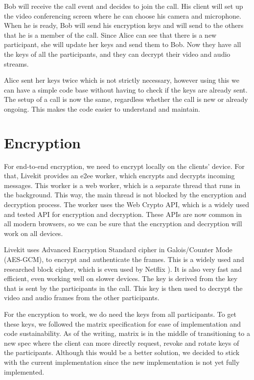 \documentclass{report}
\begin{document}
Bob will receive the call event and decides to join the call. His client will set up the video conferencing
screen where he can choose his camera and microphone. When he is ready, Bob will send his encryption keys and will
send to the others that he is a member of the call. Since Alice can see that there is a new participant, she will
update her keys and send them to Bob. Now they have all the keys of all the participants, and they can decrypt their
video and audio streams.

Alice sent her keys twice which is not strictly necessary, however using this we can have a simple code base
without having to check if the keys are already sent. The setup of a call is now the same, regardless whether
the call is new or already ongoing. This makes the code easier to understand and maintain.

\section{Encryption}
For end-to-end encryption, we need to encrypt locally on the clients' device. For that, Livekit provides an e2ee worker,
which encrypts and decrypts incoming messages. This worker is a web worker, which is a separate
thread that runs in the background. This way, the main thread is not blocked by the encryption and decryption
process. The worker uses the Web Crypto API, which is a widely used and tested API for encryption and decryption.
These APIs are now common in all modern browsers, so we can be sure that the encryption and decryption will work on
all devices.

Livekit uses Advanced Encryption Standard cipher in Galois/Counter Mode (AES-GCM)\cite{daemen_rijndael_nodate}\cite{
mcgrew_galoiscounter_nodate}, to encrypt and authenticate the frames. This is a widely used and researched block
cipher, which is even used by Netflix \cite{blog_protecting_2017}). It is also very fast and efficient, even
working well on slower devices. The key is derived from the key that is sent by the participants in the call. This
key is then used to decrypt the video and audio frames from the other
participants.


For the encryption to work, we do need the keys from all participants. To get these keys, we followed the matrix
specification for ease of implementation and code sustainability. As of the writing, matrix is in the middle of
transitioning to a new spec where the client can more directly request, revoke and rotate keys of the participants.
Although this would be a better solution, we decided to stick with the current implementation since the new
implementation is not yet fully implemented.
\end{document}
